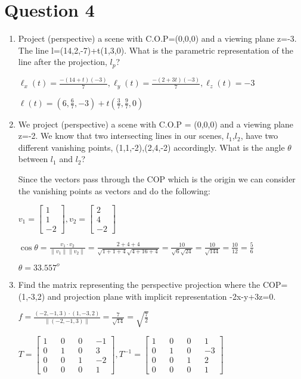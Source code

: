\documentclass{article}
\begin{document}
    \section*{Question 4}
    \begin{enumerate}
        \item Project (perspective) a scene with C.O.P=(0,0,0) and a viewing plane z=-3. The line l=(14,2,-7)+t(1,3,0). What is the parametric representation of the line after the projection, $l_p$?
        
        $\ell_x(t) = \frac{-(14 + t) (-3)}{7}, \ell_y(t) = \frac{-(2 + 3t)(-3)}{7}, \ell_z(t) = -3$

        $\ell(t) = (6, \frac{6}{7}, -3) + t (\frac{3}{7}, \frac{9}{7}, 0)$

        \item We project (perspective) a scene with C.O.P = (0,0,0) and a viewing plane z=-2. We know that two intersecting lines in our scenes, $l_1$,$l_2$, have two different vanishing points, (1,1,-2),(2,4,-2) accordingly. What is the angle $\theta$ between $l_1$ and $l_2$?
        
        Since the vectors pass through the COP which is the origin we can consider the vanishing points as vectors and do the following:

        $v_1 = \begin{bmatrix}
            1 \\ 1 \\ -2
        \end{bmatrix},
        v_2 = \begin{bmatrix}
            2 \\ 4 \\ -2
        \end{bmatrix}$

        $\cos \theta = \frac{v_1 \cdot v_2}{\|v_1\| \|v_2\|} = \frac{2 + 4 + 4}{\sqrt{1 + 1 + 4} \sqrt{4 + 16 + 4} } = \frac{10}{\sqrt{6} \sqrt{24} } = \frac{10}{\sqrt{144} }= \frac{10}{12 }= \frac{5}{6 }$

        $\theta = 33.557^o$

        \item Find the matrix representing the perspective projection where the COP=(1,-3,2) and projection plane with implicit representation -2x-y+3z=0.
        
        $f = \frac{(-2,-1,3) \cdot (1,-3,2)}{\|(-2,-1,3)\|} = \frac{7}{\sqrt{14}} = \sqrt{\frac{7}{2}} $

        $T = \begin{bmatrix}
            1 && 0 && 0 && -1 \\ 
            0 && 1 && 0 && 3 \\ 
            0 && 0 && 1 && -2 \\ 
            0 && 0 && 0 && 1 
        \end{bmatrix}, 
        T^{-1} = \begin{bmatrix}
            1 && 0 && 0 && 1 \\ 
            0 && 1 && 0 && -3 \\ 
            0 && 0 && 1 && 2 \\ 
            0 && 0 && 0 && 1 
        \end{bmatrix}$ 


\end{enumerate}
\end{document}
